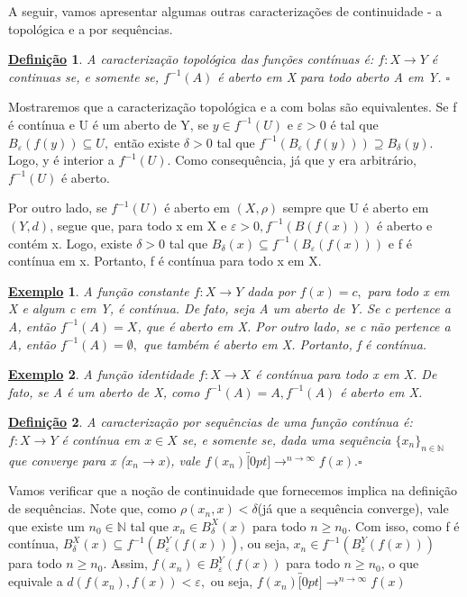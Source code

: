 \documentclass{article}
\newtheorem*{def*}{\underline{Defini\c c\~ao}}
\newtheorem{example}{\underline{Exemplo}}
\begin{document}
  A seguir, vamos apresentar algumas outras caracterizações de continuidade - a topológica e a por sequências.
 \begin{def*}
   A caracterização topológica das funções contínuas é: \(f:X\rightarrow Y\) é continuas se, e somente se, \(f^{-1}(A)\) é aberto em X para todo aberto A em Y. \(\square\)
 \end{def*}
  Mostraremos que a caracterização topológica e a com bolas são equivalentes. Se f é contínua e U é um aberto de Y, se
\(y\in f^{-1}(U)\) e \(\varepsilon > 0\) é tal que \(B_{\varepsilon }(f(y)) \subseteq{U},\) então existe \(\delta  > 0\)
tal que \(f^{-1}(B_{\varepsilon }(f(y)))\supseteq{B_{\delta }(y)}.\) Logo, y é interior a \(f^{-1}(U).\) Como
consequência, já que y era arbitrário, \(f^{-1}(U)\) é aberto.

  Por outro lado, se \(f^{-1}(U)\) é aberto em \((X, \rho )\) sempre que U é aberto em
 \((Y, d)\), segue que, para todo x em X e \(\varepsilon >0, f^{-1}(B(f(x)))\) é aberto e contém x.
 Logo, existe \(\delta  > 0\) tal que \(B_{\delta }(x)\subseteq{f^{-1}(B_{\varepsilon }(f(x)))}\) e f é contínua em x.
 Portanto, f é contínua para todo x em X.
 \begin{example}
   A função constante \(f:X\rightarrow Y\) dada por \(f(x) = c,\) para todo x em X e algum c em Y, é contínua.
  De fato, seja A um aberto de Y. Se c pertence a A, então \(f^{-1}(A) = X\), que é aberto em X. Por 
  outro lado, se c não pertence a A, então \(f^{-1}(A) = \emptyset,\) que também é aberto em X. Portanto, f é contínua.
 \end{example}
 \begin{example}
   A função identidade \(f:X\rightarrow X\) é contínua para todo x em X. De fato, se A é um aberto de X,
como \(f^{-1}(A) = A, f^{-1}(A)\) é aberto em X.
 \end{example}
 \begin{def*}
   A caracterização por sequências de uma função contínua é: \(f:X\rightarrow Y\) é contínua em \(x\in X\) se, e somente se, dada uma sequência \(\{x_{n}\}_{n\in \mathbb{N}}\) que
converge para x (\(x_{n}\longrightarrow x)\), vale \(f(x_{n})\overbracket[0pt]{\longrightarrow}^{n\to \infty}f(x).\square\)
 \end{def*}
 Vamos verificar que a noção de continuidade que fornecemos implica na definição de sequências. Note que, como \(\rho (x_{n}, x) < \delta \)(já que a sequência converge), vale que existe um \(n_{0}\in \mathbb{N}\) tal que
 \(x_{n}\in B_{\delta }^{X}(x)\) para todo \(n\geq n_{0}\). Com isso, como f é contínua, \(B_{\delta }^{X}(x)\subseteq{f^{-1}(B_{\varepsilon }^{Y}(f(x)))}\), ou seja, \(x_{n}\in f^{-1}(B_{\varepsilon }^{Y}(f(x)))\) para todo \(n\geq n_{0}.\)
 Assim, \(f(x_{n})\in B_{\varepsilon }^{Y}(f(x))\) para todo \(n\geq n_{0}\), o que equivale a \(d(f(x_{n}), f(x)) < \varepsilon,\) ou seja, \(f(x_{n})\overbracket[0pt]{\longrightarrow}^{n\to \infty}f(x)\)
\end{document}

